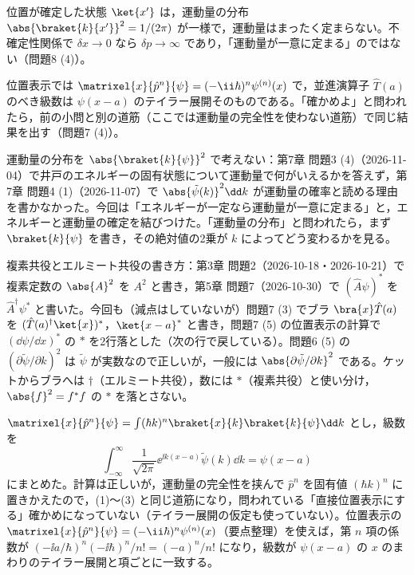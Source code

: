 \begin{daiji}
  \item 位置が確定した状態 $\ket{x'}$ は，運動量の分布 $\abs{\braket{k}{x'}}^{2}=1/(2\pi)$ が一様で，運動量はまったく定まらない。不確定性関係で $\delta x\to0$ なら $\delta p\to\infty$ であり，「運動量が一意に定まる」のではない（問題8 (4)）。
  \item 位置表示では $\matrixel{x}{\hat{p}^{n}}{\psi}=(-\ii\hbar)^{n}\psi^{(n)}(x)$ で，並進演算子 $\hat{T}(a)$ のべき級数は $\psi(x-a)$ のテイラー展開そのものである。「確かめよ」と問われたら，前の小問と別の道筋（ここでは運動量の完全性を使わない道筋）で同じ結果を出す（問題7 (4)）。
\end{daiji}
\begin{maemo}
  \item 運動量の分布を $\abs{\braket{k}{\psi}}^{2}$ で考えない：第7章 問題3 (4)（2026-11-04）で井戸のエネルギーの固有状態について運動量で何がいえるかを答えず，第7章 問題4 (1)（2026-11-07）で $\abs{\tilde{\psi}(k)}^{2}\dd k$ が運動量の確率と読める理由を書かなかった。今回は「エネルギーが一定なら運動量が一意に定まる」と，エネルギーと運動量の確定を結びつけた。「運動量の分布」と問われたら，まず $\braket{k}{\psi}$ を書き，その絶対値の2乗が $k$ によってどう変わるかを見る。
  \item 複素共役とエルミート共役の書き方：第3章 問題2（2026-10-18・2026-10-21）で複素定数の $\abs{A}^{2}$ を $A^{2}$ と書き，第5章 問題7（2026-10-30）で $(\hat{A}\psi)^{*}$ を $\hat{A}^{\dagger}\psi^{*}$ と書いた。今回も（減点はしていないが）問題7 (3) でブラ $\bra{x}\hat{T}(a)$ を $(\hat{T}(a)^{\dagger}\ket{x})^{*}$，$\ket{x-a}^{*}$ と書き，問題7 (5) の位置表示の計算で $(\dd\psi/\dd x)^{*}$ の $*$ を2行落とした（次の行で戻している）。問題6 (5) の $(\partial\tilde{\psi}/\partial k)^{2}$ は $\tilde{\psi}$ が実数なので正しいが，一般には $\abs{\partial\tilde{\psi}/\partial k}^{2}$ である。ケットからブラへは $\dagger$（エルミート共役），数には $*$（複素共役）と使い分け，$\abs{f}^{2}=f^{*}f$ の $*$ を落とさない。
\end{maemo}
\begin{kotaeran}
   $\matrixel{x}{\hat{p}^{n}}{\psi}=\int(\hbar k)^{n}\braket{x}{k}\braket{k}{\psi}\dd k$ とし，級数を
  \[ \int_{-\infty}^{\infty}\frac{1}{\sqrt{2\pi}}\ee^{\ii k(x-a)}\tilde{\psi}(k)\dd k=\psi(x-a) \]
  にまとめた。計算は正しいが，運動量の完全性を挟んで $\hat{p}^{n}$ を固有値 $(\hbar k)^{n}$ に置きかえたので，(1)〜(3) と同じ道筋になり，問われている「直接位置表示にする」確かめになっていない（テイラー展開の仮定も使っていない）。位置表示の $\matrixel{x}{\hat{p}^{n}}{\psi}=(-\ii\hbar)^{n}\psi^{(n)}(x)$（要点整理）を使えば，第 $n$ 項の係数が $(-\ii a/\hbar)^{n}(-\ii\hbar)^{n}/n!=(-a)^{n}/n!$ になり，級数が $\psi(x-a)$ の $x$ のまわりのテイラー展開と項ごとに一致する。
\end{kotaeran}
